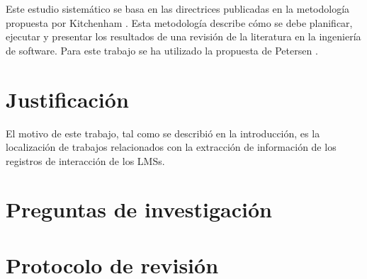 


Este estudio sistemático se basa en las directrices publicadas en la metodología propuesta por Kitchenham \cite{Kitchenham:2010}. Esta metodología describe cómo se debe planificar, ejecutar y presentar los resultados de una revisión de la literatura en la ingeniería de software. Para este trabajo se ha utilizado la propuesta de Petersen \cite{Petersen:2008}.

\section{Justificación}
El motivo de este trabajo, tal como se describió en la introducción, es la localización de trabajos relacionados con la extracción de información de los registros de interacción de los LMSs.

\section{Preguntas de investigación}

\section{Protocolo de revisión}


